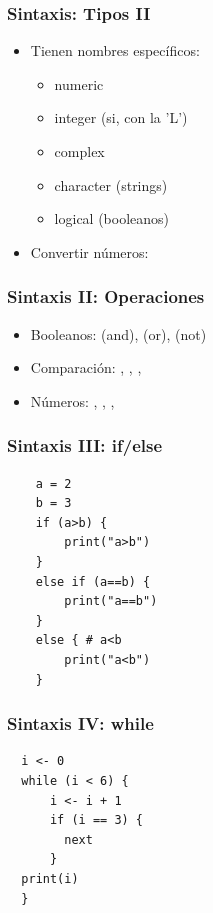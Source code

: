 \documentclass[14pt,aspectratio=169,xcolor=dvipsnames]{beamer}
\begin{document}
\begin{frame}\frametitle{Sintaxis: Tipos II}
    \begin{itemize}
        \item Tienen nombres específicos:
            \begin{itemize}
                \item numeric 
                \item integer   (si, con la 'L')
                \item complex 
                \item character  (strings)
                \item logical   (booleanos)
            \end{itemize}
        \item Convertir números: 
    \end{itemize}
\end{frame}
\begin{frame}\frametitle{Sintaxis II: Operaciones}
    \begin{itemize}
        \item Booleanos:  (and),  (or),  (not)
        \item Comparación: , , , 
        \item Números: , , , 
    \end{itemize}
\end{frame}
\begin{frame}[fragile]\frametitle{Sintaxis III: if/else}
    \begin{verbatim}
    a = 2
    b = 3
    if (a>b) {
        print("a>b")
    }
    else if (a==b) {
        print("a==b")
    }
    else { # a<b
        print("a<b")
    }
    \end{verbatim}
\end{frame}
\begin{frame}[fragile]\frametitle{Sintaxis IV: while}
    \begin{verbatim}
  i <- 0
  while (i < 6) {
      i <- i + 1
      if (i == 3) {
        next
      }
  print(i)
  } 
    \end{verbatim}
\end{frame}
\end{document}
